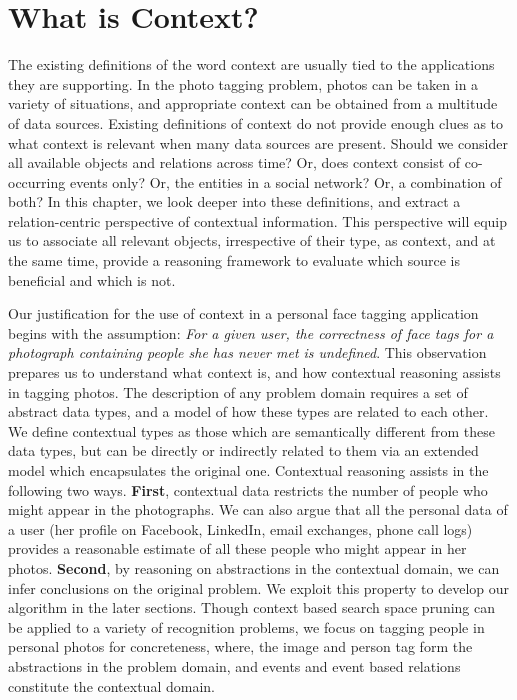 \chapter{What is Context?}

The existing definitions of the word context are usually tied to the applications they are supporting. In the photo tagging problem, photos can be taken in a variety of situations, and appropriate context can be obtained from a multitude of data sources. Existing definitions of context do not provide enough clues as to what context is relevant when many data sources are present. Should we consider all available objects and relations across time? Or, does context consist of co-occurring events only? Or, the entities in a social network? Or, a combination of both? In this chapter, we look deeper into these definitions, and extract a relation-centric perspective of contextual information. This perspective will equip us to associate all relevant objects, irrespective of their type, as context, and at the same time, provide a reasoning framework to evaluate which source is beneficial and which is not.

Our justification for the use of context in a personal face tagging application begins with the assumption: \textit{For a given user, the correctness of face tags for a photograph containing people she has never met is undefined}. This observation prepares us to understand what context is, and how contextual reasoning assists in tagging photos. The description of any problem domain requires a set of abstract data types, and a model of how these types are related to each other. We define contextual types as those which are semantically different from these data types, but can be directly or indirectly related to them via an extended model which encapsulates the original one. Contextual reasoning assists in the following two ways. \textbf{First}, contextual data restricts the number of people who might appear in the photographs. We can also argue that all the personal data of a user (her profile on Facebook, LinkedIn, email exchanges, phone call logs) provides a reasonable estimate of all these people who might appear in her photos. \textbf{Second}, by reasoning on abstractions in the contextual domain, we can infer conclusions on the original problem. We exploit this property to develop our algorithm in the later sections. Though context based search space pruning can be applied to a variety of recognition problems, we focus on tagging people in personal photos for concreteness, where, the image and person tag form the abstractions in the problem domain, and events and event based relations constitute the contextual domain. 

